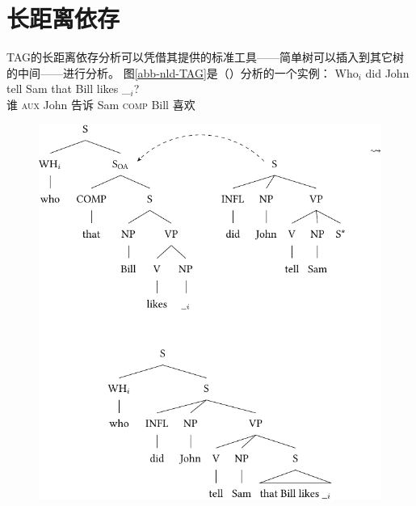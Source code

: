 \section{长距离依存}
\label{TAG-Fernabh}

TAG的长距离依存分析可以凭借其提供的标准工具——简单树可以插入到其它树的中间——进行分析。
图\vref{abb-nld-TAG}是（）分析的一个实例：
\ea
\gll Who$_i$ did John tell Sam that Bill likes \_$_i$?\\
     谁 \textsc{aux} John 告诉 Sam \textsc{comp} Bill 喜欢 \\
\z
%
\begin{figure}
\includegraphics{Figures/tag-long-distance-dependencies-crop}

\end{figure}
